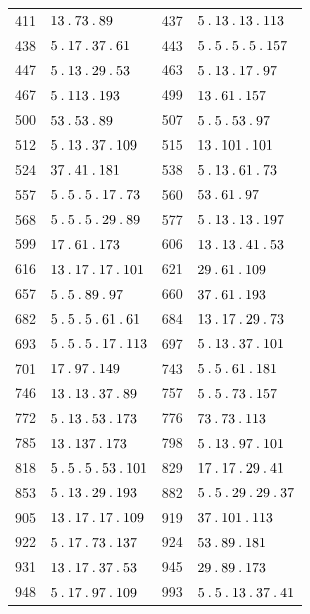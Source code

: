 \begin{longtable}{@{}r|l@{\qquad}r|l@{}}
411 & $13\mathbin{.} 73\mathbin{.} 89$ & 437 & $5\mathbin{.} 13\mathbin{.} 13\mathbin{.} 113$\\
438 & $5\mathbin{.} 17\mathbin{.} 37\mathbin{.} 61$ & 443 & $5\mathbin{.} 5\mathbin{.} 5\mathbin{.} 5\mathbin{.} 157$\\
447 & $5\mathbin{.} 13\mathbin{.} 29\mathbin{.} 53$ & 463 & $5\mathbin{.} 13\mathbin{.} 17\mathbin{.} 97$\\
467 & $5\mathbin{.} 113\mathbin{.} 193$ & 499 & $13\mathbin{.} 61\mathbin{.} 157$\\
500 & $53\mathbin{.} 53\mathbin{.} 89$ & 507 & $5\mathbin{.} 5\mathbin{.} 53\mathbin{.} 97$\\
512 & $5\mathbin{.} 13\mathbin{.} 37\mathbin{.} 109$ & 515 & $13\mathbin{.} 101\mathbin{.} 101$\\
524 & $37\mathbin{.} 41\mathbin{.} 181$ & 538 & $5\mathbin{.} 13\mathbin{.} 61\mathbin{.} 73$\\
557 & $5\mathbin{.} 5\mathbin{.} 5\mathbin{.} 17\mathbin{.} 73$ & 560 & $53\mathbin{.} 61\mathbin{.} 97$\\
568 & $5\mathbin{.} 5\mathbin{.} 5\mathbin{.} 29\mathbin{.} 89$ & 577 & $5\mathbin{.} 13\mathbin{.} 13\mathbin{.} 197$\\
599 & $17\mathbin{.} 61\mathbin{.} 173$ & 606 & $13\mathbin{.} 13\mathbin{.} 41\mathbin{.} 53$\\
616 & $13\mathbin{.} 17\mathbin{.} 17\mathbin{.} 101$ & 621 & $29\mathbin{.} 61\mathbin{.} 109$\\
657 & $5\mathbin{.} 5\mathbin{.} 89\mathbin{.} 97$ & 660 & $37\mathbin{.} 61\mathbin{.} 193$\\
682 & $5\mathbin{.} 5\mathbin{.} 5\mathbin{.} 61\mathbin{.} 61$ & 684 & $13\mathbin{.} 17\mathbin{.} 29\mathbin{.} 73$\\
693 & $5\mathbin{.} 5\mathbin{.} 5\mathbin{.} 17\mathbin{.} 113$ & 697 & $5\mathbin{.} 13\mathbin{.} 37\mathbin{.} 101$\\
701 & $17\mathbin{.} 97\mathbin{.} 149$ & 743 & $5\mathbin{.} 5\mathbin{.} 61\mathbin{.} 181$\\
746 & $13\mathbin{.} 13\mathbin{.} 37\mathbin{.} 89$ & 757 & $5\mathbin{.} 5\mathbin{.} 73\mathbin{.} 157$\\
772 & $5\mathbin{.} 13\mathbin{.} 53\mathbin{.} 173$ & 776 & $73\mathbin{.} 73\mathbin{.} 113$\\
785 & $13\mathbin{.} 137\mathbin{.} 173$ & 798 & $5\mathbin{.} 13\mathbin{.} 97\mathbin{.} 101$\\
818 & $5\mathbin{.} 5\mathbin{.} 5\mathbin{.} 53\mathbin{.} 101$ & 829 & $17\mathbin{.} 17\mathbin{.} 29\mathbin{.} 41$\\
853 & $5\mathbin{.} 13\mathbin{.} 29\mathbin{.} 193$ & 882 & $5\mathbin{.} 5\mathbin{.} 29\mathbin{.} 29\mathbin{.} 37$\\
905 & $13\mathbin{.} 17\mathbin{.} 17\mathbin{.} 109$ & 919 & $37\mathbin{.} 101\mathbin{.} 113$\\
922 & $5\mathbin{.} 17\mathbin{.} 73\mathbin{.} 137$ & 924 & $53\mathbin{.} 89\mathbin{.} 181$\\
931 & $13\mathbin{.} 17\mathbin{.} 37\mathbin{.} 53$ & 945 & $29\mathbin{.} 89\mathbin{.} 173$\\
948 & $5\mathbin{.} 17\mathbin{.} 97\mathbin{.} 109$ & 993 & $5\mathbin{.} 5\mathbin{.} 13\mathbin{.} 37\mathbin{.} 41$\\

\end{longtable}
